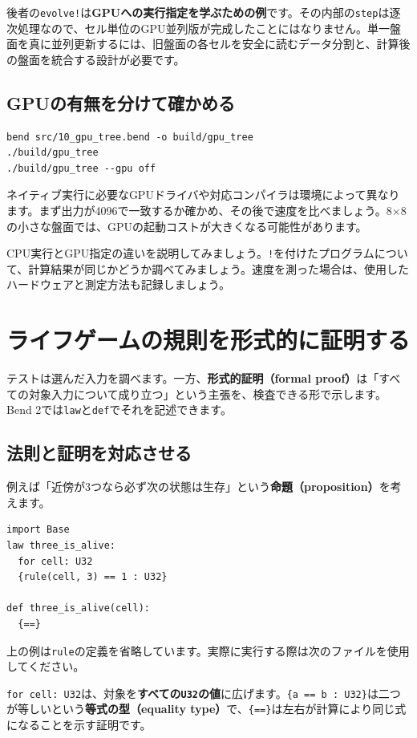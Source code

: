 \documentclass[11pt,a4paper,openany]{book}
\newcommand{\code}[1]{\texttt{#1}}
\newcommand{\term}[1]{\textbf{#1}}
\newcommand{\readcode}[2]{}
\newcommand{\exercise}[1]{\begin{exercisebox}#1\end{exercisebox}}
\begin{document}
\readcode{10_gpu_tree.bend}{GPU実行を要求する例（10\_gpu\_tree.bend）}
\readcode{32_gpu_life_call.bend}{ライフゲームの計算をGPUへ渡す書き方（32\_gpu\_life\_call.bend）}
後者の\code{evolve!}は\textbf{GPUへの実行指定を学ぶための例}です。その内部の\code{step}は逐次処理なので、セル単位のGPU並列版が完成したことにはなりません。単一盤面を真に並列更新するには、旧盤面の各セルを安全に読むデータ分割と、計算後の盤面を統合する設計が必要です。

\section{GPUの有無を分けて確かめる}
\begin{lstlisting}[language={},caption={GPU実行とCPU代替実行}]
bend src/10_gpu_tree.bend -o build/gpu_tree
./build/gpu_tree
./build/gpu_tree --gpu off
\end{lstlisting}
ネイティブ実行に必要なGPUドライバや対応コンパイラは環境によって異なります。まず出力が4096で一致するか確かめ、その後で速度を比べましょう。8×8の小さな盤面では、GPUの起動コストが大きくなる可能性があります。
\exercise{CPU実行とGPU指定の違いを説明してみましょう。\code{!}を付けたプログラムについて、計算結果が同じかどうか調べてみましょう。速度を測った場合は、使用したハードウェアと測定方法も記録しましょう。}

\chapter{ライフゲームの規則を形式的に証明する}
\begin{tcolorbox}[colback=blue!3,colframe=blue!16,boxrule=.35pt,arc=1mm,left=3mm,right=3mm,top=2mm,bottom=2mm]
\small テストは選んだ入力を調べます。一方、\term{形式的証明（formal proof）}は「すべての対象入力について成り立つ」という主張を、検査できる形で示します。Bend 2では\code{law}と\code{def}でそれを記述できます。
\end{tcolorbox}

\section{法則と証明を対応させる}
例えば「近傍が3つなら必ず次の状態は生存」という\term{命題（proposition）}を考えます。
\begin{lstlisting}[caption={法則と証明を記述する最小例}]
import Base
law three_is_alive:
  for cell: U32
  {rule(cell, 3) == 1 : U32}

def three_is_alive(cell):
  {==}
\end{lstlisting}
上の例は\code{rule}の定義を省略しています。実際に実行する際は次のファイルを使用してください。
\readcode{11_rule_proofs.bend}{生死規則に対する三つの形式的証明（11\_rule\_proofs.bend）}
\code{for cell: U32}は、対象を\textbf{すべての\code{U32}の値}に広げます。\code{\{a == b : U32\}}は二つが等しいという\term{等式の型（equality type）}で、\code{\{==\}}は左右が計算により同じ式になることを示す証明です。
\end{document}

